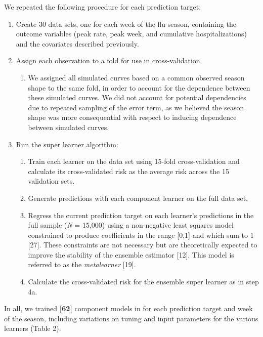 \documentclass[10pt,letterpaper]{article}
\providecommand{\tightlist}{%
  \setlength{\itemsep}{0pt}\setlength{\parskip}{0pt}}
\begin{document}
We repeated the following procedure for each prediction target:

\begin{enumerate}
\def\labelenumi{\arabic{enumi}.}
\item
  Create 30 data sets, one for each week of the flu season, containing
  the outcome variables (peak rate, peak week, and cumulative
  hospitalizations) and the covariates described previously.
\item
  Assign each observation to a fold for use in cross-validation.

  \begin{enumerate}
  \def\labelenumii{\alph{enumii}.}
  \tightlist
  \item
    We assigned all simulated curves based on a common observed season
    shape to the same fold, in order to account for the dependence
    between these simulated curves. We did not account for potential
    dependencies due to repeated sampling of the error term, as we
    believed the season shape was more consequential with respect to
    inducing dependence between simulated curves.
  \end{enumerate}
\item
  Run the super learner algorithm:

  \begin{enumerate}
  \def\labelenumii{\alph{enumii}.}
  \tightlist
  \item
    Train each learner on the data set using 15-fold cross-validation
    and calculate its cross-validated risk as the average risk across
    the 15 validation sets.
  \item
    Generate predictions with each component learner on the full data
    set.
  \item
    Regress the current prediction target on each learner's predictions
    in the full sample (\emph{N} = 15,000) using a non-negative least
    squares model constrained to produce coefficients in the range
    {[}0,1{]} and which sum to 1 {[}27{]}. These constraints are not
    necessary but are theoretically expected to improve the stability of
    the ensemble estimator {[}12{]}. This model is referred to as the
    \emph{metalearner} {[}19{]}.
  \item
    Calculate the cross-validated risk for the ensemble super learner as
    in step 4a.
  \end{enumerate}
\end{enumerate}

In all, we trained \textbf{{[}62{]}} component models in for each
prediction target and week of the season, including variations on tuning
and input parameters for the various learners (Table 2).
\end{document}

